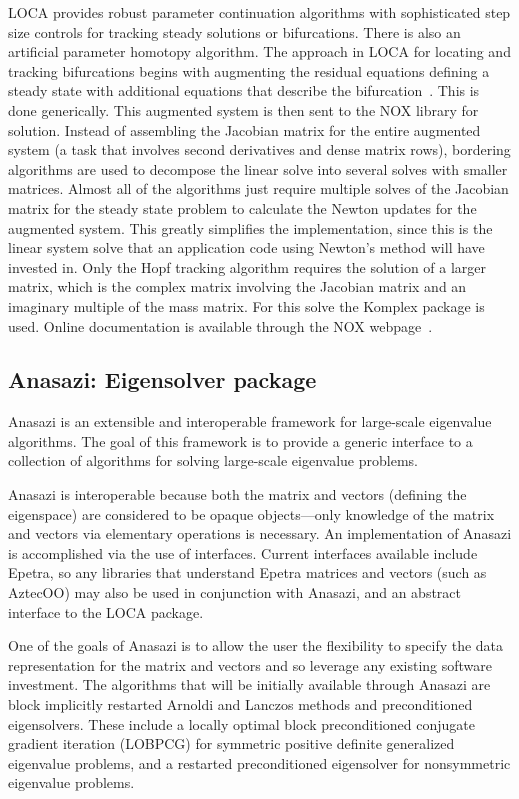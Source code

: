 \documentclass[acmtoms,acmnow]{acmtrans2m}
\begin{document}
LOCA provides robust parameter continuation algorithms 
with sophisticated step size controls for tracking steady
solutions or bifurcations. There is also an
artificial parameter homotopy algorithm.
The approach in LOCA for locating and tracking bifurcations begins with augmenting 
the residual equations defining a steady state with additional equations that 
describe the bifurcation~\cite{LOCA-manual}. This is done generically. This 
augmented system is then sent to the NOX library for solution.
Instead of assembling the Jacobian matrix for the entire 
augmented system (a task that involves second derivatives and dense matrix rows), 
bordering algorithms are used to decompose the linear solve into several solves 
with smaller matrices. Almost all of the algorithms just require multiple solves 
of the Jacobian matrix for the steady state problem to calculate the Newton 
updates for the augmented system. This greatly simplifies the implementation, 
since this is the linear system solve that an application code using Newton's 
method will have invested in. Only the Hopf tracking algorithm requires 
the solution of a larger matrix, which is the complex matrix involving the 
Jacobian matrix and an imaginary multiple of the mass matrix. For this solve
the Komplex package is used. Online documentation is available
through the NOX webpage~\cite{NOX-home-page}.

\subsection{Anasazi: Eigensolver package}


Anasazi is an extensible and interoperable framework for 
large-scale eigenvalue algorithms.  The goal of this 
framework is to provide a generic interface to a collection 
of algorithms for solving large-scale eigenvalue problems. 

Anasazi is interoperable because both the matrix and vectors (defining the
eigenspace) are considered to be opaque objects---only knowledge of the matrix and
vectors via elementary operations is necessary. An implementation of Anasazi
is accomplished via the use of interfaces. Current interfaces available include
Epetra, so any libraries that understand Epetra matrices and vectors (such
as AztecOO) may also be used in conjunction with Anasazi, and an abstract interface
to the LOCA package.

One of the goals of Anasazi is to allow the user the flexibility 
to specify the data representation for the matrix and vectors and 
so leverage any existing software
investment. The algorithms that will be initially available through 
Anasazi are block implicitly restarted Arnoldi and Lanczos methods 
and preconditioned eigensolvers.
These include a locally optimal block preconditioned conjugate 
gradient iteration  (LOBPCG) for symmetric positive definite 
generalized eigenvalue problems, and a 
restarted preconditioned eigensolver for nonsymmetric eigenvalue problems.
\end{document}
